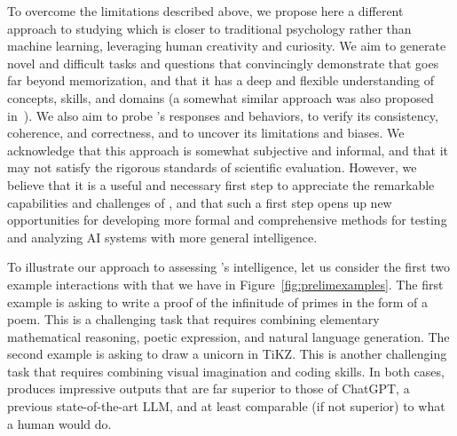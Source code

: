     To overcome the limitations described above, we propose here a different approach to studying {\DV} which is closer to traditional psychology rather than machine learning, leveraging human creativity and curiosity. We aim to generate novel and difficult tasks and questions that convincingly demonstrate that {\DV} goes far beyond memorization, and that it has a deep and flexible understanding of concepts, skills, and domains (a somewhat similar approach was also proposed in~\cite{collins2022structured}). We also aim to probe \DV's responses and behaviors, to verify its consistency, coherence, and correctness, and to uncover its limitations and biases. We acknowledge that this approach is somewhat subjective and informal, and that it may not satisfy the rigorous standards of scientific evaluation. However, we believe that it is a useful and necessary first step to appreciate the remarkable capabilities and challenges of \DV, and that such a first step opens up new opportunities for developing more formal and comprehensive methods for testing and analyzing AI systems with more general intelligence. 
    \newline
    
    To illustrate our approach to assessing \DV's intelligence, let us consider the first two example interactions with {\DV} that we have in Figure~\ref{fig:prelimexamples}. The first example is asking {\DV} to write a proof of the infinitude of primes in the form of a poem. This is a challenging task that requires combining elementary mathematical reasoning, poetic expression, and natural language generation. The second example is asking {\DV} to draw a unicorn in TiKZ. This is another challenging task that requires combining visual imagination and coding skills. In both cases, {\DV} produces impressive outputs that are far superior to those of ChatGPT, a previous state-of-the-art LLM, and at least comparable (if not superior) to what a human would do. 
    \newline
    
    
    
